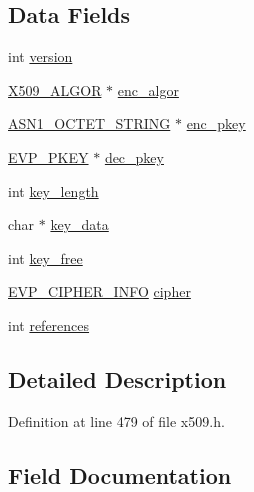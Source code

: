 \subsection*{Data Fields}
\begin{DoxyCompactItemize}
\item 
int \hyperlink{structprivate__key__st_aad880fc4455c253781e8968f2239d56f}{version}
\item 
\hyperlink{crypto_2ossl__typ_8h_aa2b6185e6254f36f709cd6577fb5022e}{X509\+\_\+\+A\+L\+G\+OR} $\ast$ \hyperlink{structprivate__key__st_a1b697f99ee5c4a04f862c7cf69f2f84f}{enc\+\_\+algor}
\item 
\hyperlink{crypto_2ossl__typ_8h_afbd05e94e0f0430a2b729473efec88c1}{A\+S\+N1\+\_\+\+O\+C\+T\+E\+T\+\_\+\+S\+T\+R\+I\+NG} $\ast$ \hyperlink{structprivate__key__st_a0e91cc9639d343f335acabf75a0ea3a5}{enc\+\_\+pkey}
\item 
\hyperlink{crypto_2ossl__typ_8h_a2fca4fef9e4c7a2a739b1ea04acb56ce}{E\+V\+P\+\_\+\+P\+K\+EY} $\ast$ \hyperlink{structprivate__key__st_a56bcbbbc2b981ddaa62d24d8fec17504}{dec\+\_\+pkey}
\item 
int \hyperlink{structprivate__key__st_a6803738672261da3543c6f8269ed135d}{key\+\_\+length}
\item 
char $\ast$ \hyperlink{structprivate__key__st_a5f6e7e0f92768ff9f15263dac38b4939}{key\+\_\+data}
\item 
int \hyperlink{structprivate__key__st_af500002979182e538b29555050743838}{key\+\_\+free}
\item 
\hyperlink{crypto_2evp_2evp_8h_a0ff32d74885621bf0ee4f962602e6c9b}{E\+V\+P\+\_\+\+C\+I\+P\+H\+E\+R\+\_\+\+I\+N\+FO} \hyperlink{structprivate__key__st_a8bb5913bbd200597cf54d84a83c48a7d}{cipher}
\item 
int \hyperlink{structprivate__key__st_a146fdb34d9a909e530adf8b189481195}{references}
\end{DoxyCompactItemize}


\subsection{Detailed Description}


Definition at line 479 of file x509.\+h.



\subsection{Field Documentation}
